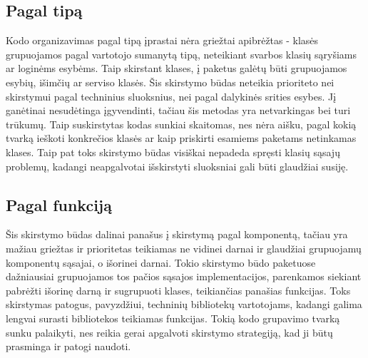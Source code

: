 \subsection{Pagal tipą}
Kodo organizavimas pagal tipą įprastai nėra griežtai apibrėžtas - klasės grupuojamos pagal vartotojo sumanytą tipą, neteikiant svarbos
klasių sąryšiams ar loginėms esybėms. Taip skirstant klases, į paketus galėtų būti grupuojamos esybių, išimčių ar serviso klasės. Šis skirstymo būdas
neteikia prioriteto nei skirstymui pagal techninius sluoksnius, nei pagal dalykinės srities esybes. Jį ganėtinai nesudėtinga įgyvendinti,
tačiau šis metodas yra netvarkingas bei turi trūkumų. Taip suskirstytas kodas sunkiai skaitomas, nes nėra aišku, pagal kokią tvarką
ieškoti konkrečios klasės ar kaip priskirti esamiems paketams netinkamas klases. Taip pat toks skirstymo būdas visiškai nepadeda spręsti
klasių sąsajų problemų, kadangi neapgalvotai išskirstyti sluoksniai gali būti glaudžiai susiję.

\subsection{Pagal funkciją}
Šis skirstymo būdas dalinai panašus į skirstymą pagal komponentą, tačiau yra mažiau griežtas ir
prioritetas teikiamas ne vidinei darnai ir glaudžiai grupuojamų
komponentų sąsajai, o išorinei darnai. Tokio skirstymo būdo paketuose dažniausiai grupuojamos tos pačios sąsajos implementacijos,
parenkamos siekiant pabrėžti išorinę darną ir sugrupuoti klases, teikiančias panašias funkcijas. Toks skirstymas patogus, pavyzdžiui,
techninių bibliotekų vartotojams, kadangi galima lengvai surasti bibliotekos teikiamas funkcijas. Tokią kodo grupavimo tvarką sunku palaikyti,
nes reikia gerai apgalvoti skirstymo strategiją, kad ji būtų prasminga ir patogi naudoti.

